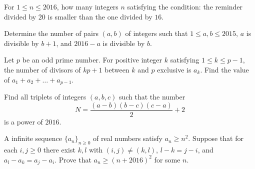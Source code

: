 \documentclass[problems.tex]{subfile}
\begin{document}
	
	
	
	\begin{problem}
		For $1\leq n\leq 2016$, how many integers $n$ satisfying the condition: the reminder divided by $20$ is smaller than the one divided by $16$. %
	\end{problem}
	
	
	
	
	
	\begin{problem}
		Determine the number of pairs $(a, b)$ of integers such that $1 \leq a, b \leq 2015$, $a$ is divisible by $b + 1$, and $2016 - a$ is divisible by $b$.%
	\end{problem}
	
	
	
	
	\begin{problem}
		Let $p$ be an odd prime number. For positive integer $k$ satisfying $1\le k\le p-1$, the number of divisors of $kp+1$ between $k$ and $p$ exclusive is $a_k$. Find the value of $a_1+a_2+\ldots + a_{p-1}$. %
	\end{problem}
	
	
	
	
	\begin{problem}
		Find all triplets of integers $(a,b,c)$ such that the number
		$$N = \frac{(a-b)(b-c)(c-a)}{2} + 2$$is a power of $2016$. %
	\end{problem}
	
	
	
	
	
	
	\begin{problem}
		A infinite sequence $\{ a_n \}_{n \ge 0}$ of real numbers satisfy $a_n \ge n^2$. Suppose that for each $i, j \ge 0$ there exist $k, l$ with $(i,j) \neq (k,l)$, $l - k = j - i$, and $a_l - a_k = a_j - a_i$. Prove that $a_n \ge (n + 2016)^2$ for some $n$. %
	\end{problem}
	
	
	
\end{document}
